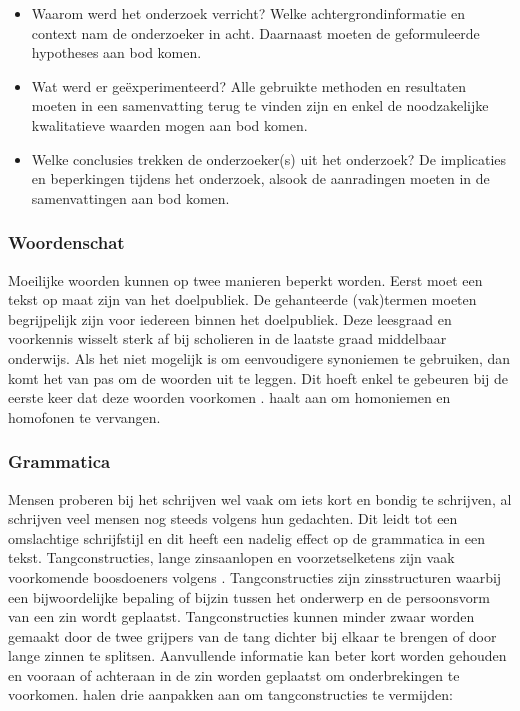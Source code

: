 \begin{itemize}
	\item Waarom werd het onderzoek verricht? Welke achtergrondinformatie en context nam de onderzoeker in acht. Daarnaast moeten de geformuleerde hypotheses aan bod komen.
	\item Wat werd er geëxperimenteerd? Alle gebruikte methoden en resultaten moeten in een samenvatting terug te vinden zijn en enkel de noodzakelijke kwalitatieve waarden mogen aan bod komen.
	\item Welke conclusies trekken de onderzoeker(s) uit het onderzoek? De implicaties en beperkingen tijdens het onderzoek, alsook de aanradingen moeten in de samenvattingen aan bod komen.
\end{itemize}

\subsubsection{Woordenschat}

Moeilijke woorden kunnen op twee manieren beperkt worden. Eerst moet een tekst op maat zijn van het doelpubliek. De gehanteerde (vak)termen moeten begrijpelijk zijn voor iedereen binnen het doelpubliek. Deze leesgraad en voorkennis wisselt sterk af bij scholieren in de laatste graad middelbaar onderwijs. Als het niet mogelijk is om eenvoudigere synoniemen te gebruiken, dan komt het van pas om de woorden uit te leggen. Dit hoeft enkel te gebeuren bij de eerste keer dat deze woorden voorkomen \autocite{Bosmans2022a, Bosmans2022b}. \textcite{Case2008} haalt aan om homoniemen en homofonen te vervangen. %

\subsubsection{Grammatica}

Mensen proberen bij het schrijven wel vaak om iets kort en bondig te schrijven, al schrijven veel mensen nog steeds volgens hun gedachten. Dit leidt tot een omslachtige schrijfstijl en dit heeft een nadelig effect op de grammatica in een tekst. Tangconstructies, lange zinsaanlopen en voorzetselketens zijn vaak voorkomende boosdoeners volgens \textcite{Bosmans2022c}. Tangconstructies zijn zinsstructuren waarbij een bijwoordelijke bepaling of bijzin tussen het onderwerp en de persoonsvorm van een zin wordt geplaatst. Tangconstructies kunnen minder zwaar worden gemaakt door de twee grijpers van de tang dichter bij elkaar te brengen of door lange zinnen te splitsen. Aanvullende informatie kan beter kort worden gehouden en vooraan of achteraan in de zin worden geplaatst om onderbrekingen te voorkomen. \textcite{Rijnvis2020, Bosmans2022c} halen drie aanpakken aan om tangconstructies te vermijden:

